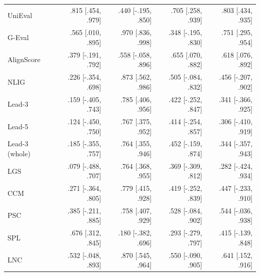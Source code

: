 \begin{table}[t]
\begin{tabular}{@{}lrrrr@{}}
UniEval & .815 {\scriptsize [.454, .979]} & .440 {\scriptsize [-.195, .850]} & .705 {\scriptsize [.258, .939]} & .803 {\scriptsize [.434, .935]} \\
G-Eval & .565 {\scriptsize [.010, .895]} & .970 {\scriptsize [.836, .998]} & .348 {\scriptsize [-.195, .830]} & .751 {\scriptsize [.295, .954]} \\
AlignScore & .379 {\scriptsize [-.191, .792]} & .558 {\scriptsize [-.058, .896]} & .655 {\scriptsize [.070, .882]} & .618 {\scriptsize [.076, .892]} \\
NLIG & .226 {\scriptsize [-.354, .698]} & .873 {\scriptsize [.562, .986]} & .505 {\scriptsize [-.084, .832]} & .456 {\scriptsize [-.207, .902]} \\
Lead-3 & .159 {\scriptsize [-.405, .743]} & .785 {\scriptsize [.406, .956]} & .422 {\scriptsize [-.252, .847]} & .341 {\scriptsize [-.366, .925]} \\
Lead-5 & .124 {\scriptsize [-.450, .750]} & .767 {\scriptsize [.375, .952]} & .414 {\scriptsize [-.254, .857]} & .306 {\scriptsize [-.410, .919]} \\
Lead-3 (whole) & .185 {\scriptsize [-.355, .757]} & .764 {\scriptsize [.355, .946]} & .452 {\scriptsize [-.159, .874]} & .344 {\scriptsize [-.357, .943]} \\
LGS & .079 {\scriptsize [-.488, .707]} & .764 {\scriptsize [.368, .955]} & .369 {\scriptsize [-.309, .812]} & .282 {\scriptsize [-.424, .934]} \\
CCM & .271 {\scriptsize [-.364, .805]} & .779 {\scriptsize [.415, .928]} & .419 {\scriptsize [-.252, .839]} & .447 {\scriptsize [-.233, .910]} \\
PSC & .385 {\scriptsize [-.211, .885]} & .758 {\scriptsize [.407, .929]} & .528 {\scriptsize [-.084, .902]} & .544 {\scriptsize [-.036, .938]} \\
SPL & .676 {\scriptsize [.312, .845]} & .180 {\scriptsize [-.382, .696]} & .293 {\scriptsize [-.279, .797]} & .415 {\scriptsize [-.139, .848]} \\
LNC & .532 {\scriptsize [-.048, .893]} & .870 {\scriptsize [.545, .964]} & .550 {\scriptsize [-.090, .905]} & .641 {\scriptsize [.152, .916]} \\
\bottomrule
\end{tabular}
\end{table}

